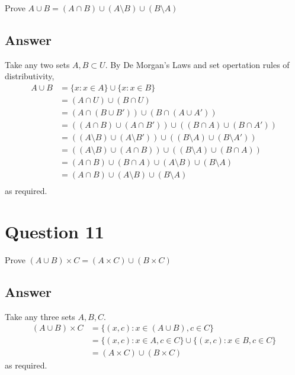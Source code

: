 \documentclass[
	12pt, %
]{fphw}
\newcommand\set[1]{\{#1\}}
\newcommand\qed{\text{$\blacksquare$}}
\begin{document}
\begin{problem}
Prove $A \cup B = (A \cap B) \cup (A \setminus B) \cup (B \setminus A)$
\end{problem}


\subsection*{Answer}
 Take any two sets $A, B \subset U$. By De Morgan's Laws and set opertation rules of distributivity,
\begin{align*}
A \cup B &= \set{x : x \in A} \cup \set{x : x \in B}\\
&=(A \cap U) \cup (B \cap U)\\
&=(A \cap (B \cup B')) \cup (B \cap (A \cup A'))\\
&=((A \cap B) \cup (A \cap B')) \cup ((B \cap A) \cup (B \cap A'))\\
&=((A \setminus B) \cup (A \setminus B')) \cup ((B \setminus A) \cup (B \setminus A'))\\
&=((A \setminus B) \cup (A \cap B)) \cup ((B \setminus A) \cup (B \cap A))\\
&=(A \cap B) \cup (B \cap A) \cup (A \setminus B) \cup (B \setminus A)\\
&=(A \cap B) \cup (A \setminus B) \cup (B \setminus A)\\
\end{align*}
as required. \qed

\section*{Question 11}

\begin{problem}
Prove $(A \cup B) \times C = (A \times C) \cup (B \times C)$
\end{problem}


\subsection*{Answer}
 Take any three sets $A, B, C$.
\begin{align*}
(A \cup B) \times C &= \set{(x, c) : x \in (A \cup B), c \in C}\\
&= \set{(x, c) : x \in A, c \in C} \cup \set{(x, c) : x \in B, c \in C} \\
&=(A \times C) \cup (B \times C)
\end{align*}
as required. \qed
\end{document}
